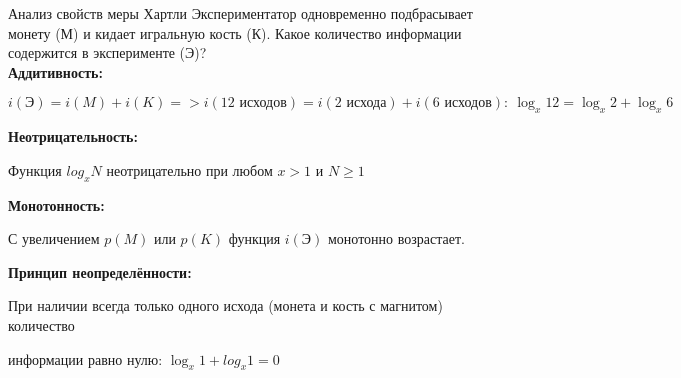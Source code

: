 \begin{frame}{Анализ свойств меры Хартли}
\noindent Экспериментатор одновременно подбрасывает монету (М) и кидает игральную кость (К).
Какое количество информации содержится в эксперименте (Э)?\\
\vspace{1.5em}
\color[rgb]{0,0.5,0.0}\noindent\textbf{Аддитивность:}

\color{black}$i(\mbox{Э})=i(M)+i(K)=>i(\mbox{12 исходов})=i(\mbox{2 исхода})+i(\mbox{6 исходов}):\ \log_x12=\log_x2+\log_x6$

\color[rgb]{0,0.5,0.0}\noindent\textbf{Неотрицательность:}

\color{black}Функция $log_xN$ неотрицательно при любом $x>1$ и $N\geq1$

\color[rgb]{0,0.5,0.0}\noindent\textbf{Монотонность:}

\color{black}С увеличением $p(M)$ или $p(K)$ функция $i(\mbox{Э})$ монотонно возрастает.

\color[rgb]{0,0.5,0.0}\noindent\textbf{Принцип неопределённости:}

\color{black}При наличии всегда только одного исхода (монета и кость с магнитом) количество

информации равно нулю: $\log_x1+log_x1=0$
\end{frame}